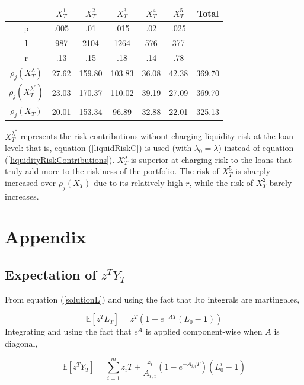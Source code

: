\documentclass[12pt]{article}
\theoremstyle{definition}
\begin{document}
\begin{table}[H]
\centering
\begin{tabular}{ccccccc}
&\(X_T^1\) & \(X_T^2\)& \(X_T^3\)& \(X_T^4\)& \(X_T^5\)  & Total\\
\hline
p& .005 & .01& .015& .02& .025 & \\
l & 987 &2104 & 1264 & 576 &377 &\\
r & .13 & .15 & .18 & .14 & .78  &\\
\(\rho_j\left(X_T^\lambda\right)\) & 27.62&159.80&103.83&36.08&42.38&369.70 \\
\(\rho_j\left(X_T ^ {\lambda^*}\right)\) & 23.03&170.37&110.02&39.19&27.09&369.70 \\
\(\rho_j(X_T)\) & 20.01&153.34&96.89&32.88&22.01&325.13 \\

\end{tabular}
\end{table}
\(X_T ^ {\lambda^*} \) represents the risk contributions without charging liquidity risk at the loan level: that is, equation (\ref{liquidRiskC}) is used (with \(\lambda_0=\lambda\)) instead of equation (\ref{liquidityRiskContributions}).  \(X_T ^ \lambda\) is superior at charging risk to the loans that truly add more to the riskiness of the portfolio.  The risk of \(X_T ^ 5\) is sharply increased over \(\rho_j (X_T)\) due to its relatively high \(r\), while the risk of \(X_T ^ 2\) barely increases.


\section{Appendix}
\subsection{Expectation of \(z^T Y_T\)}
From equation (\ref{solutionL}) and using the fact that Ito integrals are martingales, 

\begin{equation}
\mathbb{E}[z^T L_T]=z^T \left(\mathbf{1}+e^{-AT}(L_0-\mathbf{1})\right)
\end{equation}
Integrating and using the fact that \(e^A\) is applied component-wise when \(A\) is diagonal,

\begin{equation}
\mathbb{E}[z^T Y_T]=\sum_{i=1} ^ m z_i T+\frac{z_i}{A_{i,i}}\left(1-e^{-{A}_{i, i}T}\right)(L_0^ i-\mathbf{1})\end{equation}
\end{document}
